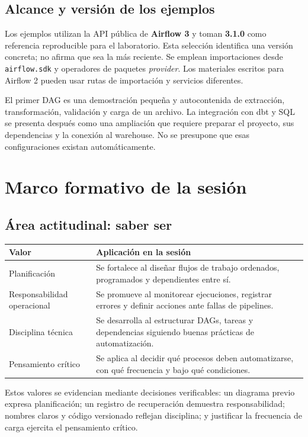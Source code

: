 \documentclass[12pt]{article}
\begin{document}
\subsection{Alcance y versión de los ejemplos}
Los ejemplos utilizan la API pública de \textbf{Airflow 3} y toman \textbf{3.1.0} como referencia reproducible para el laboratorio. Esta selección identifica una versión concreta; no afirma que sea la más reciente. Se emplean importaciones desde \texttt{airflow.sdk} y operadores de paquetes \textit{provider}. Los materiales escritos para Airflow 2 pueden usar rutas de importación y servicios diferentes.

El primer DAG es una demostración pequeña y autocontenida de extracción, transformación, validación y carga de un archivo. La integración con dbt y SQL se presenta después como una ampliación que requiere preparar el proyecto, sus dependencias y la conexión al warehouse. No se presupone que esas configuraciones existan automáticamente.

\section{Marco formativo de la sesión}
\subsection{Área actitudinal: saber ser}
\begin{longtable}{@{}p{}p{}@{}}
\toprule
\textbf{Valor} & \textbf{Aplicación en la sesión} \\
\midrule
Planificación & Se fortalece al diseñar flujos de trabajo ordenados, programados y dependientes entre sí. \\
Responsabilidad operacional & Se promueve al monitorear ejecuciones, registrar errores y definir acciones ante fallas de pipelines. \\
Disciplina técnica & Se desarrolla al estructurar DAGs, tareas y dependencias siguiendo buenas prácticas de automatización. \\
Pensamiento crítico & Se aplica al decidir qué procesos deben automatizarse, con qué frecuencia y bajo qué condiciones. \\
\bottomrule
\end{longtable}
Estos valores se evidencian mediante decisiones verificables: un diagrama previo expresa planificación; un registro de recuperación demuestra responsabilidad; nombres claros y código versionado reflejan disciplina; y justificar la frecuencia de carga ejercita el pensamiento crítico.
\end{document}
